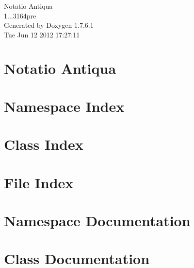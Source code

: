 \documentclass[a4paper]{article}
\begin{document}
\hypersetup{pageanchor=false,citecolor=blue}
\begin{titlepage}
\vspace*{7cm}
\begin{center}
{\Large \-Notatio \-Antiqua \\[1ex]\large 1...\-3164pre }\\
\vspace*{1cm}
{\large \-Generated by Doxygen 1.7.6.1}\\
\vspace*{0.5cm}
{\small Tue Jun 12 2012 17:27:11}\\
\end{center}
\end{titlepage}
\tableofcontents
{}
\hypersetup{pageanchor=true,citecolor=blue}
\section{\-Notatio \-Antiqua}
\label{index}\hypertarget{index}{}
\section{\-Namespace \-Index}

\section{\-Class \-Index}

\section{\-File \-Index}

\section{\-Namespace \-Documentation}


\section{\-Class \-Documentation}



















\end{document}
